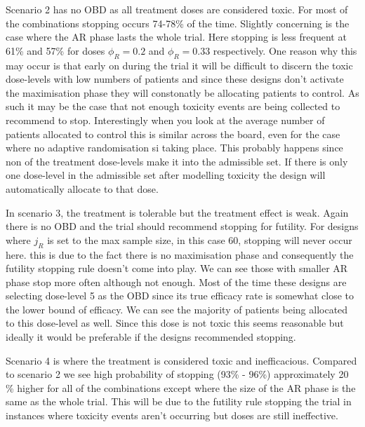 Scenario 2 has no OBD as all treatment doses are considered toxic. For most of the combinations stopping occurs 74-78\% of the time. Slightly concerning is the case where the AR phase lasts the whole trial. Here stopping is less frequent at 61\% and 57\% for doses $\phi_R = 0.2$ and $\phi_R = 0.33$ respectively. One reason why this may occur is that early on during the trial it will be difficult to discern the toxic dose-levels with low numbers of patients and since these designs don't activate the maximisation phase they will constonatly be allocating patients to control. As such it may be the case that not enough toxicity events are being collected to recommend to stop. Interestingly when you look at the average number of patients allocated to control this is similar across the board, even for the case where no adaptive randomisation si taking place. This probably happens since non of the treatment dose-levels make it into the admissible set. If there is only one dose-level in the admissible set after modelling toxicity the design will automatically allocate to that dose.  

In scenario 3, the treatment is tolerable but the treatment effect is weak. Again there is no OBD and the trial should recommend stopping for futility. For designs where $j_R$ is set to the max sample size, in this case 60, stopping will never occur here. this is due to the fact there is no maximisation phase and consequently the futility stopping rule doesn't come into play. We can see those with smaller AR phase stop more often although not enough. Most of the time these designs are selecting dose-level 5 as the OBD since its true efficacy rate is somewhat close to the lower bound of efficacy. We can see the majority of patients being allocated to this dose-level as well. Since this dose is not toxic this seems reasonable but ideally it would be preferable if the designs recommended stopping. 

Scenario 4 is where the treatment is considered toxic and inefficacious. Compared to scenario 2 we see high probability of stopping (93\% - 96\%) approximately 20 \% higher for all of the combinations except where the size of the AR phase is the same as the whole trial. This will be due to the futility rule stopping the trial in instances where toxicity events aren't occurring but doses are still ineffective. 

